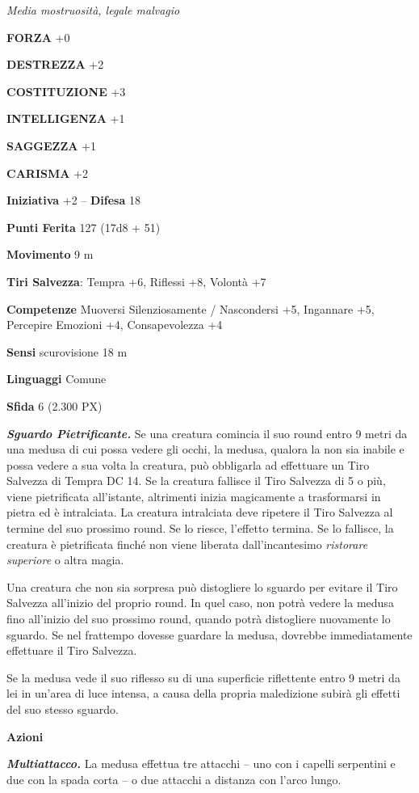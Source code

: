 \begin{multicols}{2}
\textit{Media mostruosità, legale malvagio}

\textbf{FORZA} +0

\textbf{DESTREZZA} +2

\textbf{COSTITUZIONE} +3

\textbf{INTELLIGENZA} +1

\textbf{SAGGEZZA} +1

\textbf{CARISMA} +2

\textbf{Iniziativa} +2 -- \textbf{Difesa} 18

\textbf{Punti Ferita} 127 (17d8 + 51)

\textbf{Movimento} 9 m

\textbf{Tiri Salvezza}: Tempra +6, Riflessi +8, Volontà +7

\textbf{Competenze} Muoversi Silenziosamente / Nascondersi +5, Ingannare +5, Percepire Emozioni +4, Consapevolezza +4

\textbf{Sensi} scurovisione 18 m

\textbf{Linguaggi} Comune

\textbf{Sfida} 6 (2.300 PX)

\textit{\textbf{Sguardo Pietrificante.}} Se una creatura comincia il suo round entro 9 metri da una medusa di cui possa vedere gli occhi, la medusa, qualora la non sia inabile e possa vedere a sua volta la creatura, può obbligarla ad effettuare un Tiro Salvezza di Tempra DC 14. Se la creatura fallisce il Tiro Salvezza di 5 o più, viene pietrificata all'istante, altrimenti inizia magicamente a trasformarsi in pietra ed è intralciata. La creatura intralciata deve ripetere il Tiro Salvezza al termine del suo prossimo round. Se lo riesce, l'effetto termina. Se lo fallisce, la creatura è pietrificata finché non viene liberata dall'incantesimo \textit{ristorare superiore} o altra magia.

Una creatura che non sia sorpresa può distogliere lo sguardo per evitare il Tiro Salvezza all'inizio del proprio round. In quel caso, non potrà vedere la medusa fino all'inizio del suo prossimo round, quando potrà distogliere nuovamente lo sguardo. Se nel frattempo dovesse guardare la medusa, dovrebbe immediatamente effettuare il Tiro Salvezza.

Se la medusa vede il suo riflesso su di una superficie riflettente entro 9 metri da lei in un'area di luce intensa, a causa della propria maledizione subirà gli effetti del suo stesso sguardo.

\textbf{Azioni}

\textit{\textbf{Multiattacco.}} La medusa effettua tre attacchi -- uno con i capelli serpentini e due con la spada corta -- o due attacchi a distanza con l'arco lungo.




\end{multicols}
